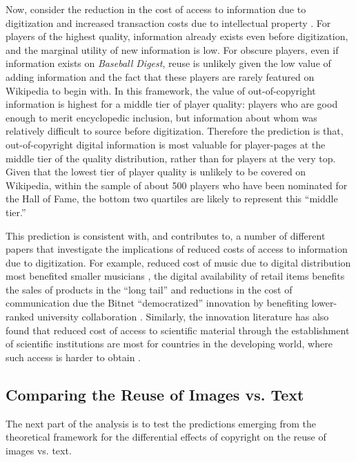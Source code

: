 \documentclass[11pt]{article}
\begin{document}
Now, consider the reduction in the cost of access to information due to digitization \citep{goldfarb_introduction_2014} and increased transaction costs due to intellectual property \citep{williams_intellectual_2013}. For players of the highest quality, information already exists even before digitization, and the marginal utility of new information is low. For obscure players, even if information exists on \emph{Baseball Digest}, reuse is unlikely given the low value of adding information and the fact that these players are rarely featured on Wikipedia to begin with. In this framework, the value of out-of-copyright information is highest for a middle tier of player quality: players who are good enough to merit encyclopedic inclusion, but information about whom was relatively difficult to source before digitization. Therefore the prediction is that, out-of-copyright digital information is most valuable for player-pages at the middle tier of the quality distribution, rather than for players at the very top. Given that the lowest tier of player quality is unlikely to be covered on Wikipedia, within the sample of about 500 players who have been nominated for the Hall of Fame, the bottom two quartiles are likely to represent this ``middle tier.''

This prediction is consistent with, and contributes to, a number of different papers that investigate the implications of reduced costs of access to information due to digitization. For example, reduced cost of music due to digital distribution most benefited smaller musicians \citep{mortimer_supply_2012}, the digital availability of retail items benefits the sales of products in the ``long tail'' \citep{brynjolfsson_goodbye_2011} and reductions in the cost of communication due the Bitnet ``democratized'' innovation by benefiting lower-ranked university collaboration \citep{agrawal_restructuring_2008}. Similarly, the innovation literature has also found that reduced cost of access to scientific material through the establishment of scientific institutions are most for countries in the developing world, where such access is harder to obtain \citep{furman_climbing_2011}.

\subsection{Comparing the Reuse of Images vs. Text}
\label{sec:diff1}

The next part of the analysis is to test the predictions emerging from the theoretical framework for the differential effects of copyright on the reuse of images vs. text.
\end{document}
